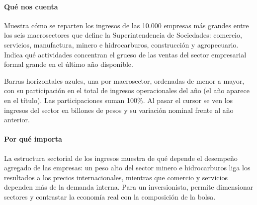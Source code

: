 \paragraph{Qué nos cuenta}
Muestra cómo se reparten los ingresos de las 10.000 empresas más grandes entre los seis macrosectores que define la Superintendencia de Sociedades: comercio, servicios, manufactura, minero e hidrocarburos, construcción y agropecuario. Indica qué actividades concentran el grueso de las ventas del sector empresarial formal grande en el último año disponible.

\begin{leer}
Barras horizontales azules, una por macrosector, ordenadas de menor a mayor, con su participación en el total de ingresos operacionales del año (el año aparece en el título). Las participaciones suman 100\%. Al pasar el cursor se ven los ingresos del sector en billones de pesos y su variación nominal frente al año anterior.
\end{leer}

\paragraph{Por qué importa}
La estructura sectorial de los ingresos muestra de qué depende el desempeño agregado de las empresas: un peso alto del sector minero e hidrocarburos liga los resultados a los precios internacionales, mientras que comercio y servicios dependen más de la demanda interna. Para un inversionista, permite dimensionar sectores y contrastar la economía real con la composición de la bolsa.

